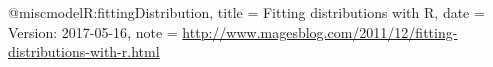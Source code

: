 @misc{modelR:fittingDistribution,
title = {{Fitting distributions with R}},
date = {Version: 2017-05-16},
note = {\url{http://www.magesblog.com/2011/12/fitting-distributions-with-r.html}}}
